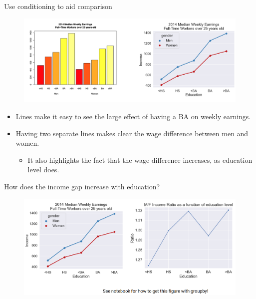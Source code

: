 \documentclass[aspectratio=169]{../latex_main/tntbeamer}  %
\begin{document}
	\begin{frame}{Use conditioning to aid comparison}
	    \begin{figure}
	        \centering
	        \includegraphics[scale=.4]{Bild56}
	    \end{figure}
	    \begin{itemize}
	        \item Lines make it easy to see the large effect of having a BA on weekly earnings.
	        \item Having two separate lines makes clear the wage difference between men and women.
	        \begin{itemize}
	            \item It also highlights the fact that the wage difference increases, as education level does.
	        \end{itemize}
	    \end{itemize}
	\end{frame}
	
	\begin{frame}{How does the income gap increase with education?}
	    \begin{figure}
	        \centering
	        \includegraphics[scale=.4]{Bild57}
	    \end{figure}
	\end{frame}
	
	
	
\end{document}
